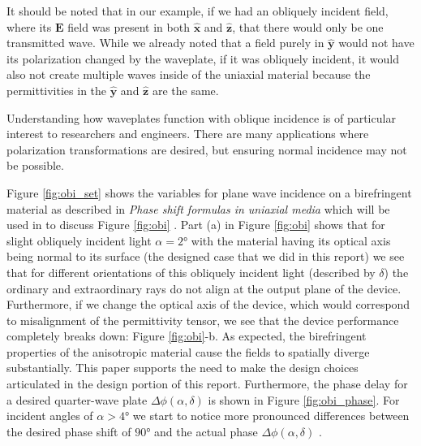 \documentclass{optica-article}
\newcommand{\bv}[1]{\mathbf{#1}}
\begin{document}
It should
be noted that in our example, if we had an obliquely incident field, where
its $\bv{E}$ field was present in both $\bv{\hat{x}}$ and $\bv{\hat{z}}$, that
there would only be one transmitted wave. While we already noted that a field
purely in $\bv{\hat{y}}$ would not have its polarization changed by the
waveplate, if it was obliquely incident, it would also not create multiple
waves inside of the uniaxial material because the permittivities in the 
$\bv{\hat{y}}$ and $\bv{\hat{z}}$ are the same.



Understanding how waveplates function with oblique incidence is of particular
interest to researchers and engineers. There are many applications where
polarization transformations are desired, but ensuring normal incidence may
not be possible.



Figure \ref{fig:obi_set} shows the variables for plane wave incidence on a 
birefringent material as described in 
\textit{Phase shift formulas in uniaxial media} which will be used in 
to discuss Figure \ref{fig:obi} \cite{OBI_phase}. 
Part (a) in Figure \ref{fig:obi} shows that for 
slight obliquely incident light $\alpha =\ang{2}$ with the material having its
optical axis being normal to its surface (the designed case that we did in this
report) we see that for different orientations of this obliquely incident
light (described by $\delta$) the ordinary and extraordinary rays do not align 
at the
output plane of the device. Furthermore, if we change the optical axis of the
device, which would correspond to misalignment of the permittivity tensor,
we see that the device performance completely breaks down: 
Figure \ref{fig:obi}-b. As expected, the birefringent properties of the 
anisotropic material cause the fields to spatially diverge substantially. 
This paper supports the need to make the design 
choices articulated in the design portion of this report. Furthermore, 
the phase delay for a desired quarter-wave plate $\Delta \phi (\alpha,\delta)$ 
is shown in Figure \ref{fig:obi_phase}. For incident angles of $\alpha>\ang{4}$
we start to notice more pronounced differences between the desired phase
shift of $\ang{90}$ and the actual phase $\Delta \phi (\alpha,\delta)$ 
\cite{OBI_phase}.


\end{document}
